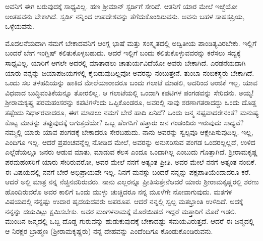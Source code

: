 \enginline{-}ಅವನಿಗೆ ಈಗ ಬರುವುದಕ್ಕೆ ಸಾಧ್ಯವಿಲ್ಲ. ಹಣ ಶ‍್ರೀಮಾನ್ ಸ್ಟರ್ಡಿಗೆ ಸೇರಿದೆ. ಆತನಿಗೆ ಯಾರ ಮೇಲೆ ಇಚ್ಚೆಯೋ ಅಂತಹವನು ಬೇಕಾಗಿದೆ. ಸ್ವರ್ಡಿ ನನ್ನಿಂದ ಉಪದೇಶವನ್ನು ತೆಗೆದುಕೊಂಡಿರುವನು. ಅವನು ಬಹಳ ಸಾಹಸಪ್ರಿಯ, ಒಳ್ಳೆಯವನು.

ಮೊದಲನೆಯದಾಗಿ ನಮಗೆ ಬೇಕಾದವನಿಗೆ ಆಂಗ್ಲ ಭಾಷೆ ಮತ್ತು ಸಂಸ್ಕೃತದಲ್ಲಿ ಅದ್ವಿತೀಯ ಪಾಂಡಿತ್ಯವಿರಬೇಕು. ಇಲ್ಲಿಗೆ ಬಂದರೆ ಬೇಗ ಇಂಗ್ಲಿಷ್ ಕಲಿತುಕೊಳ್ಳಬಹುದು. ಆದರೆ ಇಲ್ಲಿಗೆ ಬಂದು ಕಲಿತುಕೊಳ್ಳುವವರನ್ನು ಕರೆಸಲು ಸದ್ಯಕ್ಕೆ ಸಾಧ್ಯವಿಲ್ಲ. ಯಾರಿಗೆ ಆಗಲೇ ಅದರಲ್ಲಿ ಮಾತಾಡಲು ಚಾತುರ್ಯವಿದೆಯೋ ಅವರು ಬೇಕಾಗಿದೆ. ಎರಡನೆಯದಾಗಿ ಯಾರು ನನ್ನನ್ನು ಜಯಾಪಜಯಗಳಲ್ಲಿ ಕೈಬಿಡುವುದಿಲ್ಲವೋ ಅವರನ್ನು ನಂಬುತ್ತೇನೆ. ತುಂಬಾ ನಂಬಿಕಸ್ಥರು ಬೇಕಾಗಿದೆ. ಒಂದು ಸಲ ತಳಹದಿಯನ್ನು ಹಾಕಿದ ಮೇಲೆ\break ಯಾರಾದರೂ ಬಂದು ಗಲಾಟೆ ಮಾಡಲಿ, ಅದರಿಂದ ಅಂಜಿಕೆ ಇಲ್ಲ.\enginline{-} ಯಾವ ವಿಧವಾದ ಬುದ್ಧಿವಂತಿಕೆಯನ್ನೂ ತೋರಲಿಲ್ಲ. ಆ ಗಲಾಟೆಯಲ್ಲಿ ಒಂದಾಗಿ ಕಪಟಿಗಳ ಪಂಗಡವನ್ನು ಸೇರಿದನು. ಅಯ್ಯ! ಶ‍್ರೀರಾಮಕೃಷ್ಣ ಪರಮಹಂಸರನ್ನು ಕಪಟಿಗಳೆಂದು ಒಪ್ಪಿಕೊಂಡರೂ, ಅವರಲ್ಲಿ ನಾವು ಶರಣಾಗತರಾದದ್ದು ಒಂದು ದೊಡ್ಡ ತಪ್ಪೆಂದು ನಿರ್ಧಾರವಾದರೂ, ಈಗ ಮಾಡಲು ನಮಗೆ ಬೇರೆ ಹಾದಿ ಏನಿದೆ? ಒಂದು ಜನ್ಮ ನಷ್ಟವಾದರೇನಂತೆ? ಮನುಷ್ಯ ಕೊಟ್ಟ ಮಾತನ್ನು ತಪ್ಪುವುದಕ್ಕೆ ಆಗುತ್ತದೆಯೇ? ಒಬ್ಬ ಹೆಂಗಸಿಗೆ ಹತ್ತಾರು ಜನ ಗಂಡಂದಿರು ಇರುವುದು ಸಾಧ್ಯವೆ? ನಮ್ಮಲ್ಲಿ ಯಾರು ಯಾವ ಪಂಗಡಕ್ಕೆ ಬೇಕಾದರೂ ಸೇರಬಹುದು. ನಾನು ಅವರನ್ನು ಸ್ವಲ್ಪವೂ ಆಕ್ಷೇಪಿಸುವುದಿಲ್ಲ. ಇಲ್ಲ, ಎಂದಿಗೂ ಇಲ್ಲ. ಆದರೆ ಪ್ರಪಂಚವನ್ನೆಲ್ಲ ನೋಡಿದ ಮೇಲೆ, ಅವರನ್ನು ಅನುಸರಿಸುವ ಪಂಗಡ ಒಂದರಲ್ಲಲ್ಲದೆ, ಉಳಿದ ಎಲ್ಲೆಡೆಯಲ್ಲೂ ಜನರು ಆಡುವ ಮಾತು, ಮಾಡುವ ಕೆಲಸ ಎಂದೂ ಒಂದಾಗಿಲ್ಲ ಎಂಬುದು ಗೊತ್ತಾಗಿದೆ. ಶ‍್ರೀರಾಮಕೃಷ್ಣ ಪರಮಹಂಸರಿಗೆ ಯಾರು ಸೇರಿರುವರೋ, ಅವರ ಮೇಲೆ ನನಗೆ ಅತ್ಯಂತ ಪ್ರೀತಿ. ಅವರ ಮೇಲೆ ನನಗೆ ಅತ್ಯಂತ ನಂಬಿಕೆ. ಈ ವಿಷಯದಲ್ಲಿ ನನಗೆ ಬೇರೆ ಅಭಿಪ್ರಾಯವೇ ಇಲ್ಲ. ನಿನಗೆ ಮನಸ್ಸು ಬಂದರೆ ನನ್ನನ್ನು ಪಕ್ಷ\break ಪಾತಿಯೆಂದಾದರೂ ಕರೆ. ಆದರೆ ಅಲ್ಲಿ ಮಾತ್ರ ನನ್ನ ನೆಚ್ಚಿನವರಿರುವರು. ನಾನು ಎಲ್ಲರನ್ನೂ ಪ್ರೀತಿಸುತ್ತೇನೆ\enginline{-}ಆದರೆ ಯಾರು ಶ‍್ರೀರಾಮಕೃಷ್ಣರಲ್ಲಿ ಶರಣು ಹೊಂದಿರುವರೊ ಅವರ ಕಾಲಿಗೆ ಒಂದು ಮುಳ್ಳು ಚುಚ್ಚಿದರೂ ನನ್ನ ಮೂಳೆಗೇ ನೋವಾಗುವುದು. ಮತಗಳ ವಿಷಯದಲ್ಲಿ ನನ್ನಷ್ಟು ಉದಾರ ಹೃದಯದವರು ಅಪರೂಪ. ಆದರೆ ನನ್ನಲ್ಲಿ ಸ್ವಲ್ಪ ಮತಭ್ರಾಂತಿ ಉಳಿದಿದೆ. ಅದಕ್ಕೆ ನನ್ನನ್ನು ದಯವಿಟ್ಟು ಕ್ಷಮಿಸಬೇಕು. ಅವರ ಮಂಗಳನಾಮಕ್ಕೆ  ಮೊರೆಯಿಡದೆ ಇದ್ದರೆ ಮತ್ತಾರಿಗೆ ಮೊರೆ ಇಡಲಿ. ಮುಂದಿನ ಜನ್ಮದಲ್ಲಿ ಒಬ್ಬ ದೊಡ್ಡ ಗುರುವನ್ನು ಹುಡುಕುವುದಕ್ಕೆ ಬೇಕಾದಷ್ಟು ಸಮಯವಿರುತ್ತದೆ. ಆದರೆ ಈ ಜನ್ಮದಲ್ಲಿ ಆ ನಿರಕ್ಷರ ಬ್ರಾಹ್ಮಣ (ಶ‍್ರೀರಾಮಕೃಷ್ಣರು) ನನ್ನ ದೇಹವನ್ನು ಎಂದೆಂದಿಗೂ ಕೊಂಡುಕೊಂಡಿರುವನು.
\vspace{0.4cm}

